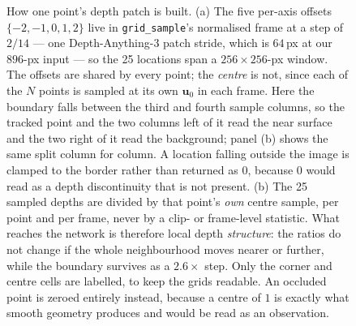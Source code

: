\documentclass[11pt,a4paper]{article}
\begin{document}
\begin{figure}[p]
\caption{How one point's depth patch is built. (a) The five per-axis offsets $\{-2,-1,0,1,2\}$ live
in \texttt{grid\_sample}'s normalised frame at a step of $2/14$ --- one Depth-Anything-3 patch
stride, which is $64$\,px at our $896$-px input --- so the 25 locations span a $256{\times}256$-px
window. The offsets are shared by every point; the \emph{centre} is not, since each of the $N$ points
is sampled at its own $\mathbf{u}_0$ in each frame. Here the boundary falls between the third and
fourth sample columns, so the tracked point and the two columns left of it read the near surface and
the two right of it read the background; panel (b) shows the same split column for column. A location
falling outside the image is clamped to the border rather than returned as $0$, because $0$ would
read as a depth discontinuity that is not present. (b) The 25 sampled depths are divided by that
point's \emph{own} centre sample, per point and per frame, never by a clip- or frame-level statistic.
What reaches the network is therefore local depth \emph{structure}: the ratios do not change if the
whole neighbourhood moves nearer or further, while the boundary survives as a $2.6\times$ step. Only
the corner and centre cells are labelled, to keep the grids readable. An occluded point is zeroed
entirely instead, because a centre of $1$ is exactly what smooth geometry produces and would be read
as an observation.}
\label{fig:depth-patch-build}
\end{figure}
\end{document}
